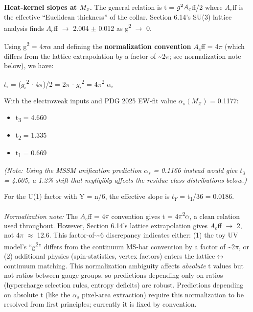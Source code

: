 \documentclass[11pt,a4paper]{article}
\theoremstyle{remark}
\providecommand{\tightlist}{%
  \setlength{\itemsep}{0pt}\setlength{\parskip}{0pt}}
\begin{document}
\textbf{Heat-kernel slopes at \(M_Z\).} The general relation is t = \(g\textsuperscript{2}A_e\)ff/2 where
\(A_e\)ff is the effective ``Euclidean thickness'' of the collar. Section 6.14's
SU(3) lattice analysis finds \(A_e\)ff \ensuremath{\to} 2.004 \ensuremath{\pm} 0.012 as g\textsuperscript{2} \ensuremath{\to} 0.

Using g\textsuperscript{2} = 4\ensuremath{\pi}\ensuremath{\alpha} and defining the \textbf{normalization convention} \(A_e\)ff = 4\ensuremath{\pi}
(which differs from the lattice extrapolation by a factor of \textasciitilde2\ensuremath{\pi}; see
normalization note below), we have:

\(t_i\) = (\(g_i\)\textsuperscript{2} \ensuremath{\cdot} 4\ensuremath{\pi})/2 = 2\ensuremath{\pi} \ensuremath{\cdot} \(g_i\)\textsuperscript{2} = 4\ensuremath{\pi}\textsuperscript{2} \(\ensuremath{\alpha}_i\)

With the electroweak inputs and PDG 2025 EW-fit value \(\ensuremath{\alpha}_s(M_Z)\) = 0.1177:

\begin{itemize}
\tightlist
\item
  t\textsubscript{3} = 4.660
\item
  t\textsubscript{2} = 1.335
\item
  t\textsubscript{1} = 0.669
\end{itemize}

\emph{(Note: Using the MSSM unification prediction \(\ensuremath{\alpha}_s\) = 0.1166 instead would give
\(t_3\) = 4.605, a 1.2\% shift that negligibly affects the residue-class distributions
below.)}

For the U(1) factor with Y = n/6, the effective slope is \(t_Y\) = t\textsubscript{1}/36 = 0.0186.

\emph{Normalization note:} The \(A_e\)ff = 4\ensuremath{\pi} convention gives t = 4\ensuremath{\pi}\textsuperscript{2}\ensuremath{\alpha}, a clean
relation used throughout. However, Section 6.14's lattice extrapolation
gives \(A_e\)ff \ensuremath{\to} 2, not 4\ensuremath{\pi} \ensuremath{\approx} 12.6. This factor-of-\textasciitilde6 discrepancy indicates
either: (1) the toy UV model's ``g\textsuperscript{2}'' differs from the continuum MS-bar
convention by a factor of \textasciitilde2\ensuremath{\pi}, or (2) additional physics (spin-statistics,
vertex factors) enters the lattice\ensuremath{\leftrightarrow}continuum matching. This normalization
ambiguity affects \emph{absolute} t values but not ratios between gauge groups,
so predictions depending only on ratios (hypercharge selection rules,
entropy deficits) are robust. Predictions depending on absolute t (like
the \(\ensuremath{\alpha}_s\) pixel-area extraction) require this normalization to be resolved
from first principles; currently it is fixed by convention.
\end{document}
